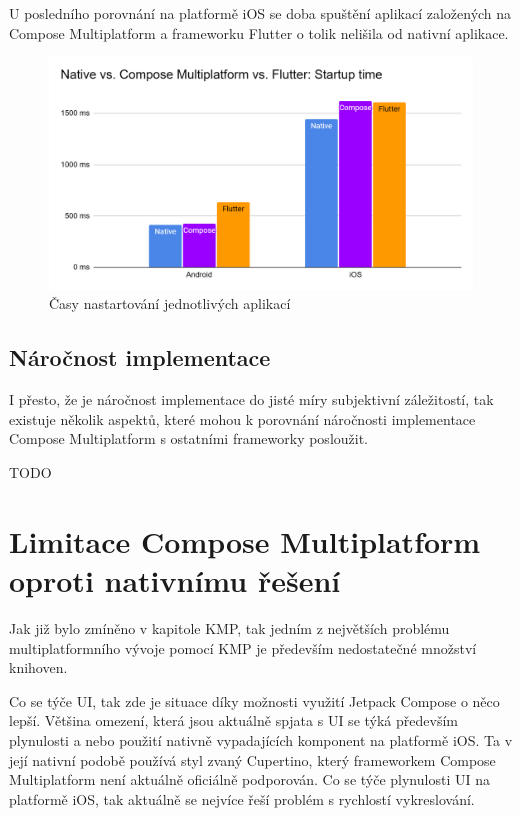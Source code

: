 U posledního porovnání na platformě iOS se doba spuštění aplikací založených na Compose Multiplatform a frameworku 
Flutter o tolik nelišila od nativní aplikace.


\begin{figure}[H]
  \centering
  \includegraphics[width=.7\textwidth]{chart_startup_times.png}
  \caption{Časy nastartování jednotlivých aplikací}
  \label{fig:chart_startup_times}
\end{figure}

\subsection{Náročnost implementace}
I přesto, že je náročnost implementace do jisté míry subjektivní záležitostí, tak existuje několik aspektů, které mohou k porovnání 
náročnosti implementace Compose Multiplatform s ostatními frameworky posloužit. 

TODO

\section{Limitace Compose Multiplatform oproti nativnímu řešení} 
Jak již bylo zmíněno v kapitole KMP, tak jedním z největších problému multiplatformního vývoje pomocí KMP je
především nedostatečné množství knihoven. 

Co se týče UI, tak zde je situace díky možnosti využití Jetpack Compose o něco lepší. Většina omezení, která jsou
aktuálně spjata s UI se týká především plynulosti a nebo použití nativně vypadajících komponent na platformě iOS.
Ta v její nativní podobě používá styl zvaný Cupertino, který frameworkem Compose Multiplatform není aktuálně oficiálně podporován. 
Co se týče plynulosti UI na platformě iOS, tak aktuálně se nejvíce řeší problém s rychlostí vykreslování.

